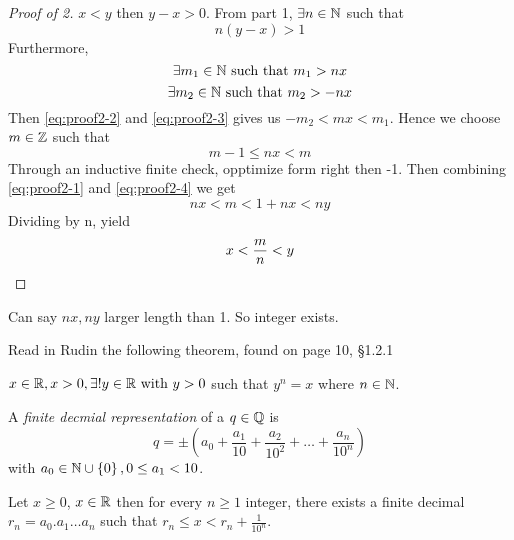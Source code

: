\begin{proof}[Proof of 2]
	\( x < y \) then \( y - x > 0 \). From part 1, \( \exists n \in \mathbb{N} \)
	such that  
	\begin{equation}
		n (y-x) > 1
		\label{eq:proof2-1}
	\end{equation}
	Furthermore, 
	\begin{equation}
		\exists m_1 \in \mathbb{N} \text{ such that } m_1 > nx
		\label{eq:proof2-2}
	\end{equation}
	\begin{equation}
		\exists m_2 \in \mathbb{N} \text{ such that } m_2 > -nx
		\label{eq:proof2-3}
	\end{equation}
	Then \ref{eq:proof2-2} and \ref{eq:proof2-3} gives us \( -m_2 < mx < m_1 \).
	Hence we choose \( m \in \mathbb{Z} \) such that
	\begin{equation}
		m-1 \le nx < m
		\label{eq:proof2-4}
	\end{equation}
	Through an inductive finite check, opptimize form right then -1.
	Then combining \ref{eq:proof2-1} and \ref{eq:proof2-4} we get
	\[
		nx < m < 1 + nx < ny
	\]
	Dividing by n, yield
	\[
		x < \frac{m}{n} < y \qedhere
	\]
\end{proof}

\begin{note}
	Can say \( nx, ny \) larger length than 1. So integer exists.
\end{note} 

\begin{assign}
	Read in Rudin the following theorem, found on page 10, \S 1.2.1
\end{assign}
\begin{theorem}
	\( x \in \mathbb{R}, x > 0, \exists ! y \in \mathbb{R} \text{ with } y > 0 \)
	such that \( y^{n} = x \) where \( n \in \mathbb{N} \).
\end{theorem}

\begin{definition}
	A {\em finite decmial representation}  of a \( q \in \mathbb{Q} \) is 
	\[
		q = \pm  \left( a_0 + \frac{a_1}{10} + \frac{a_2}{10^2} + \dots + \frac{a_n}{10^n} \right)
	\]
	with \( a_0 \in \mathbb{N} \cup \left\{ 0 \right\}, 0 \le a_1 < 10 \). 
\end{definition}
\begin{theorem}
	Let \( x \ge 0 \), \( x \in \mathbb{R} \) then for every \( n \ge 1 \) integer, 
	there exists a finite decimal \( r_n = a_0.a_1 \dots a_n \) such that
	\( r_n \le x < r_n + \frac{1}{10^n} \).
\end{theorem}

